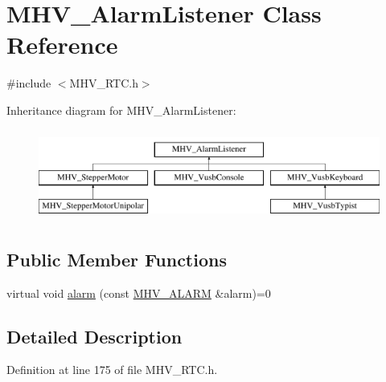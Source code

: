 \hypertarget{class_m_h_v___alarm_listener}{
\section{\-M\-H\-V\-\_\-\-Alarm\-Listener \-Class \-Reference}
\label{class_m_h_v___alarm_listener}
}


{\ttfamily \#include $<$\-M\-H\-V\-\_\-\-R\-T\-C.\-h$>$}

\-Inheritance diagram for \-M\-H\-V\-\_\-\-Alarm\-Listener\-:\begin{figure}[H]
\begin{center}
\leavevmode
\includegraphics[height=3.000000cm]{class_m_h_v___alarm_listener}
\end{center}
\end{figure}
\subsection*{\-Public \-Member \-Functions}
\begin{DoxyCompactItemize}
\item 
virtual void \hyperlink{class_m_h_v___alarm_listener_a59516fb8f83aa8b1e7b3d566ad19528b}{alarm} (const \hyperlink{_m_h_v___r_t_c_8h_af13307658f41fba330ffae04dd5cbce6}{\-M\-H\-V\-\_\-\-A\-L\-A\-R\-M} \&alarm)=0
\end{DoxyCompactItemize}


\subsection{\-Detailed \-Description}


\-Definition at line 175 of file \-M\-H\-V\-\_\-\-R\-T\-C.\-h.



